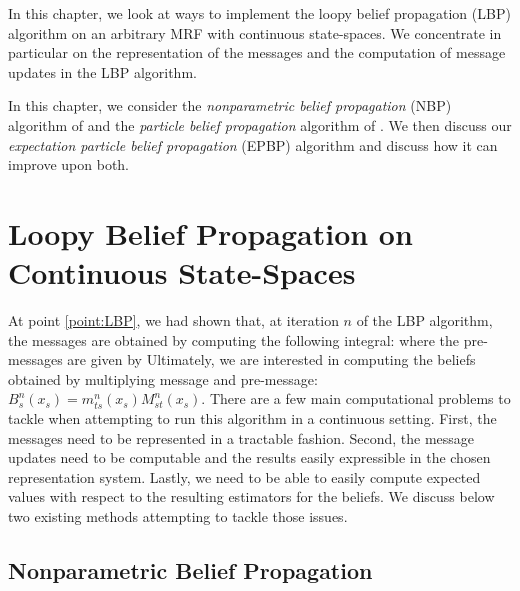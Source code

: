 
In this chapter, we look at ways to implement the loopy belief propagation (LBP) algorithm on an arbitrary MRF with continuous state-spaces. We concentrate in particular on the representation of the messages and the computation of message updates in the LBP algorithm. 

In this chapter, we consider the \emph{nonparametric belief propagation} (NBP) algorithm of \citet{sudderth03} and the \emph{particle belief propagation} algorithm of \citet{ihler09}. We then discuss our \emph{expectation particle belief propagation} (EPBP) algorithm \citep{lienart15} and discuss how it can improve upon both. 

\section{\label{sec:LBPonCS}Loopy Belief Propagation on Continuous State-Spaces}
At point \ref{point:LBP}, we had shown that, at iteration $n$ of the LBP algorithm, the messages are obtained by computing the following integral:
where the pre-messages are given by 
Ultimately, we are interested in computing the beliefs obtained by multiplying message and pre-message: $B_{s}^{n}(x_{s}) = m^{n}_{ts}(x_{s})M^{n}_{st}(x_{s})$. There are a few main computational problems to tackle when attempting to run this algorithm in a continuous setting. First, the messages need to be represented in a tractable fashion. Second, the message updates need to be computable and the results easily expressible in the chosen representation system. Lastly, we need to be able to easily compute expected values with respect to the resulting estimators for the beliefs. We discuss below two existing methods attempting to tackle those issues.
\subsection{Nonparametric Belief Propagation}

